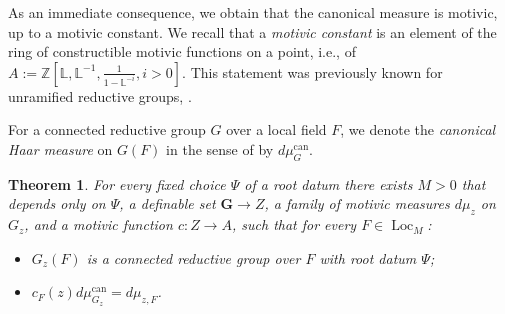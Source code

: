 \documentclass{amsart}
\newcommand{\Z}{{\mathbb Z}}
\newcommand{\loc}{\operatorname{Loc}}
\newcommand{\bG}{\mathbf{G}}
\newcommand{\can}{\mathrm{can}}
\newcommand\lef{\mathbb L}
\theoremstyle{plain}
\newtheorem{theorem}[thm]{Theorem}
\theoremstyle{definition}
\begin{document}
As an immediate consequence, we obtain that the canonical measure is motivic, up to a motivic constant. 
We recall that a \emph{motivic constant} is an element of the ring of constructible motivic functions on a point, i.e.,  of $A:=\Z[\lef, \lef^{-1}, \frac{1}{1-\lef^{-i}}, i>0]$. 
This statement was previously known for unramified reductive groups, \cite{cluckers-hales-loeser}. 

For a connected reductive group $G$ over a local field $F$, we denote the \emph{canonical Haar measure} on $G(F)$ in the sense of \cite{gross:motive} by $d\mu_G^\can$. 
\begin{theorem} For every fixed choice $\Psi$ of a root datum there exists $M>0$ that depends only on 
$\Psi$, a  definable set $\bG \to Z$, a family of  motivic measures $d\mu_z$ on $G_z$, and a motivic function $c:Z\to A$, such that for every $F\in \loc_M$: 
\begin{itemize} 
\item $G_z(F)$ is a connected reductive group over $F$ with root datum $\Psi$;
\item $c_F(z) d\mu_{G_z}^\can = d\mu_{z, F}$.
 \end{itemize} 
\end{theorem} 




\begin{bibdiv}
\begin{biblist}
\end{biblist}
\end{bibdiv}
\end{document}
